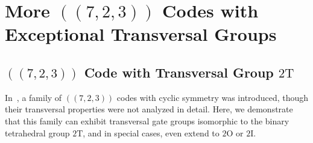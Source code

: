 \documentclass[8pt]{article}
\theoremstyle{definition}
\begin{document}
\section{More \texorpdfstring{$((7,2,3))$}{((7,2,3))} Codes with Exceptional Transversal Groups}\label{appendix:723exceptional}

\subsection{\texorpdfstring{$((7,2,3))$}{((7,2,3))} Code with Transversal Group \texorpdfstring{$2\mathrm{T}$}{2T}}

In~\cite{du2024characterizing}, a family of \(((7,2,3))\) codes with cyclic symmetry was introduced, though their transversal properties were not analyzed in detail. Here, we demonstrate that this family can exhibit transversal gate groups isomorphic to the binary tetrahedral group \(2\mathrm{T}\), and in special cases, even extend to \(2\mathrm{O}\) or \(2\mathrm{I}\).
\end{document}
